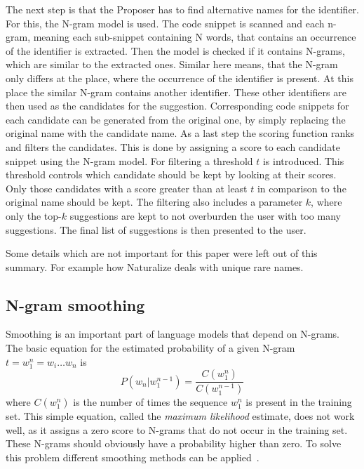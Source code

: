 The next step is that the Proposer has to find alternative names for the identifier. For this, the N-gram model is used. The code snippet is scanned and each n-gram, meaning each sub-snippet containing N words, that contains an occurrence of the identifier is extracted. Then the model is checked if it contains N-grams, which are similar to the extracted ones. Similar here means, that the N-gram only differs at the place, where the occurrence of the identifier is present. At this place the similar N-gram contains another identifier. These other identifiers are then used as the candidates for the suggestion. Corresponding code snippets for each candidate can be generated from the original one, by simply replacing the original name with the candidate name. As a last step the scoring function ranks and filters the candidates. This is done by assigning a score to each candidate snippet using the N-gram model.
For filtering a threshold $t$ is introduced. This threshold controls which candidate should be kept by looking at their scores. Only those candidates with
a score greater than at least $t$ in comparison to the original name should be kept. The filtering also includes a parameter $k$, where only the top-$k$ suggestions are kept to not overburden the user with too many suggestions. The final list of suggestions is then presented to the user.

Some details which are not important for this paper were left out of this summary. For example how
Naturalize deals with unique rare names.

\subsection{N-gram smoothing}
Smoothing is an important part of language models that depend on N-grams. The basic equation for the estimated probability of a given N-gram $t=w_1^n=w_i\hdots w_n$ is
\begin{equation}
    P(w_n | w_1^{n-1}) =  \frac{C(w_1^n)}{C(w_1^{n-1})}
\end{equation}
where $C(w_1^n)$ is the number of times the sequence $w_1^n$ is present in the training set.
This simple equation, called the \emph{maximum likelihood} estimate, does not work well, as it assigns a zero score to N-grams that do not occur in the training set. These N-grams should obviously have a probability higher than zero. To solve this problem different smoothing methods can be applied~\cite{smoothingStudy}.

